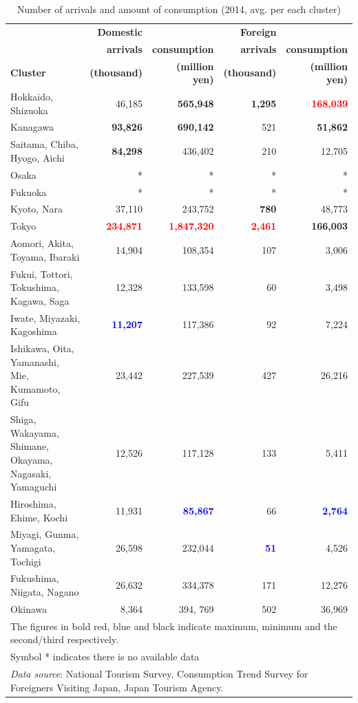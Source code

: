 \documentclass[10pt, conference, compsocconf]{IEEEtran}
\newcommand{\mr}[1]{\textcolor{red}{\bf#1}}%
\newcommand{\mb}[1]{\textcolor{blue}{\bf#1}}%
\begin{document}
 \begin{table}[!t]\caption{Number of arrivals and amount of consumption (2014, avg. per each cluster)}\label{consume}
\centering
\begin{tabular}{lrrrr}
\hline
 &\bf  Domestic &  & \bf Foreign\\
 & \bf arrivals & \bf consumption & \bf arrivals & \bf consumption \\
\bf Cluster & \bf (thousand) & \bf (million yen) & \bf (thousand) & \bf (million yen) \\\hline
Hokkaido,  Shizuoka & 46,185 & \bf{565,948} & \bf{1,295} & \ \mr{168,039} \\
Kanagawa & \bf{93,826} & \bf{690,142} & 521 & \bf{51,862} \\
Saitama, Chiba, Hyogo, Aichi & \bf{84,298} & 436,402 & 210 & 12,705 \\
Osaka & * & * & * & * \\
Fukuoka & * & * & * & * \\
Kyoto, Nara & 37,110 & 243,752 & \bf{780} & 48,773 \\
Tokyo & \mr{234,871} & \mr{1,847,320} & \mr{2,461} & \bf{166,003} \\
Aomori, Akita, Toyama, Ibaraki & 14,904 & 108,354 & 107 & 3,006 \\
Fukui, Tottori, Tokushima, Kagawa, Saga & 12,328 & 133,598 & 60 & 3,498 \\
Iwate,  Miyazaki,  Kagoshima & \mb{11,207} & 117,386 & 92 & 7,224 \\
Ishikawa, Oita, Yamanashi, Mie, Kumamoto, Gifu & 23,442 & 227,539 & 427 & 26,216 \\
Shiga,  Wakayama,  Shimane,  Okayama,  Nagasaki,  Yamaguchi & 12,526 & 117,128 & 133 & 5,411 \\
Hiroshima, Ehime, Kochi & 11,931 & \mb{85,867} & 66 & \mb{2,764} \\
Miyagi,  Gunma,  Yamagata,  Tochigi & 26,598 & 232,044 & \mb{51} & 4,526 \\
Fukushima, Niigata, Nagano & 26,632 & 334,378 & 171 & 12,276 \\
Okinawa & 8,364 & 394, 769 & 502 & 36,969 \\\hline
\multicolumn{5}{l}{The figures in bold red, blue and black indicate maximum, minimum and the second/third respectively.}\\
\multicolumn{5}{l}{Symbol * indicates there is no available data}\\
\multicolumn{5}{l}{{\it Data source}: National Tourism Survey, Consumption Trend Survey for Foreigners Visiting Japan, Japan Tourism Agency.}
\end{tabular}
\end{table}
\end{document}
